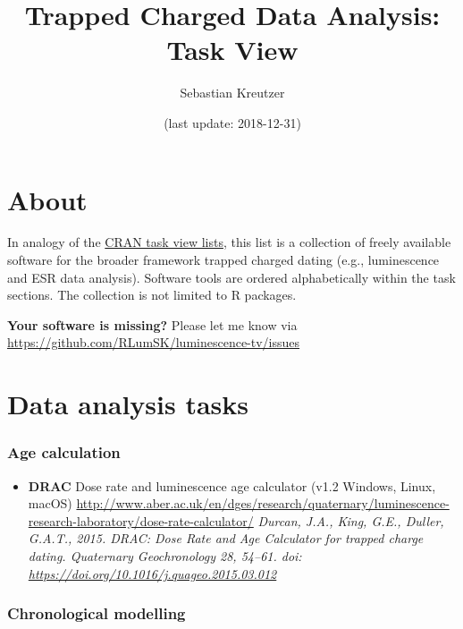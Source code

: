 \documentclass[]{article}
\title{Trapped Charged Data Analysis: Task View}
\author{Sebastian Kreutzer}
\date{(last update: 2018-12-31)}
\providecommand{\tightlist}{%
  \setlength{\itemsep}{0pt}\setlength{\parskip}{0pt}}
\begin{document}
\maketitle

\hypertarget{about}{%
\section{About}\label{about}}

In analogy of the \href{https://cran.rstudio.com/web/views/}{CRAN task view lists},
this list is a collection of freely available software for the broader framework
trapped charged dating (e.g., luminescence and ESR data analysis). Software tools are
ordered alphabetically within the task sections. The collection is not limited to R packages.

\textbf{Your software is missing?} Please let me know via \url{https://github.com/RLumSK/luminescence-tv/issues}

\hypertarget{data-analysis-tasks}{%
\section{Data analysis tasks}\label{data-analysis-tasks}}

\hypertarget{age-calculation}{%
\subsubsection{Age calculation}\label{age-calculation}}

\begin{itemize}
\tightlist
\item
  \textbf{DRAC}
  Dose rate and luminescence age calculator
  (v1.2 \textbar{} Windows, Linux, macOS)
  \url{http://www.aber.ac.uk/en/dges/research/quaternary/luminescence-research-laboratory/dose-rate-calculator/}
  \emph{Durcan, J.A., King, G.E., Duller, G.A.T., 2015. DRAC: Dose Rate and Age Calculator for trapped charge dating. Quaternary Geochronology 28, 54--61. doi: \url{https://doi.org/10.1016/j.quageo.2015.03.012}}
\end{itemize}

\hypertarget{chronological-modelling}{%
\subsubsection{Chronological modelling}\label{chronological-modelling}}
\end{document}
